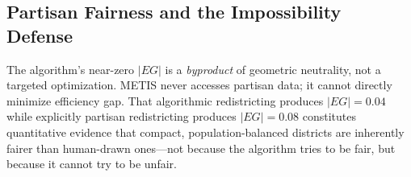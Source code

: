 \subsection{Partisan Fairness and the Impossibility Defense}

The algorithm's near-zero $|EG|$ is a \emph{byproduct} of geometric
neutrality, not a targeted optimization. METIS never accesses partisan
data; it cannot directly minimize efficiency gap. That algorithmic
redistricting produces $|EG| = 0.04$ while explicitly partisan
redistricting produces $|EG| = 0.08$ constitutes quantitative evidence
that compact, population-balanced districts are inherently fairer than
human-drawn ones---not because the algorithm tries to be fair, but
because it cannot try to be unfair.

